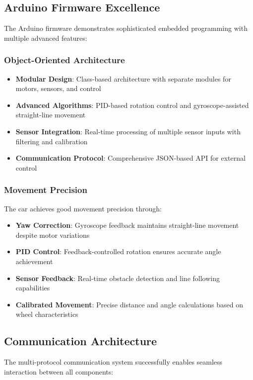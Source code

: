 \subsection{Arduino Firmware Excellence}

The Arduino firmware demonstrates sophisticated embedded programming with multiple advanced features:

\subsubsection{Object-Oriented Architecture}
\begin{itemize}
    \item \textbf{Modular Design}: Class-based architecture with separate modules for motors, sensors, and control
    \item \textbf{Advanced Algorithms}: PID-based rotation control and gyroscope-assisted straight-line movement
    \item \textbf{Sensor Integration}: Real-time processing of multiple sensor inputs with filtering and calibration
    \item \textbf{Communication Protocol}: Comprehensive JSON-based API for external control
\end{itemize}

\subsubsection{Movement Precision}
The car achieves good movement precision through:
\begin{itemize}
    \item \textbf{Yaw Correction}: Gyroscope feedback maintains straight-line movement despite motor variations
    \item \textbf{PID Control}: Feedback-controlled rotation ensures accurate angle achievement
    \item \textbf{Sensor Feedback}: Real-time obstacle detection and line following capabilities
    \item \textbf{Calibrated Movement}: Precise distance and angle calculations based on wheel characteristics
\end{itemize}

\subsection{Communication Architecture}

The multi-protocol communication system successfully enables seamless interaction between all components:

